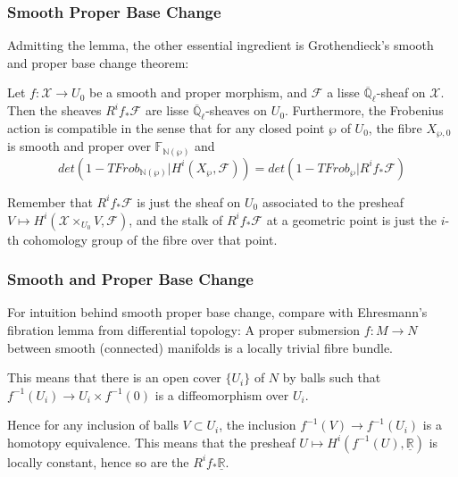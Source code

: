 \documentclass{beamer}
\begin{document}
\begin{frame}
\frametitle{Smooth Proper Base Change}
Admitting the lemma, the other essential ingredient is Grothendieck's smooth and proper base change theorem:
\pause
\begin{theorem}
Let $f:\mathcal{X}\rightarrow U_0$ be a smooth and proper morphism, and $\mathcal{F}$ a lisse $\overline{\mathbb{Q}}_{\ell}$-sheaf on $\mathcal{X}$. Then the sheaves $R^{i}f_{*}\mathcal{F}$ are lisse $\overline{\mathbb{Q}}_{\ell}$-sheaves on $U_0$. Furthermore, the Frobenius action is compatible in the sense that for any closed point $\wp$ of $U_{0}$, the fibre $X_{\wp,0}$ is smooth and proper over $\mathbb{F}_{\mathbb{N}(\wp)}$ and
$$det(1-TFrob_{\mathbb{N}(\wp)}|H^{i}(X_{\wp},\mathcal{F})) = det(1-TFrob_{\wp}|R^{i}f_{*}\mathcal{F})$$
\end{theorem}


\pause
Remember that $R^{i}f_{*}\mathcal{F}$ is just the sheaf on $U_{0}$ associated to the presheaf $V \mapsto H^{i}(\mathcal{X}\times_{U_0}V,\mathcal{F})$, and the stalk of $R^{i}f_{*}\mathcal{F}$ at a geometric point is just the $i$-th cohomology group of the fibre over that point.\\ 

\end{frame}

\begin{frame}
\frametitle{Smooth and Proper Base Change }
For intuition behind smooth proper base change, compare with Ehresmann's fibration lemma from differential topology: A proper submersion $f:M\rightarrow N$ between smooth (connected) manifolds is a locally trivial fibre bundle. 

\pause
\vspace{1cm}
This means that there is an open cover $\{U_{i}\}$ of $N$ by balls such that $f^{-1}(U_{i}) \rightarrow U_{i}\times f^{-1}(0)$ is a diffeomorphism over $U_{i}$. 

\pause
\vspace{1cm}
Hence for any inclusion of balls $V\subset U_{i}$, the inclusion $f^{-1}(V) \rightarrow f^{-1}(U_{i})$ is a homotopy equivalence. This means that the presheaf $U \mapsto H^{i}(f^{-1}(U),\underline{\mathbb{R}})$ is locally constant, hence so are the $R^{i}f_{*}\underline{\mathbb{R}}$. 
 

\end{frame}
\end{document}
